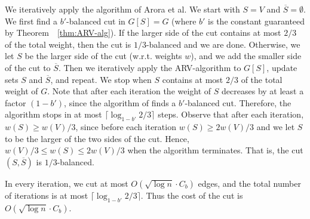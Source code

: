 \documentclass[twoside,leqno,twocolumn]{article}
\newcommand{\nots}{\overline S}
\begin{document}
We iteratively apply the algorithm of Arora et al. We start with $S = V$ and $\nots=\emptyset$. We first find a $b'$-balanced cut in $G[S] = G$ 
(where $b'$ is the constant guaranteed by Theorem~~\ref{thm:ARV-alg}). If the larger side of the cut contains at most $2/3$ of the total weight,
then the cut is $1/3$-balanced and we are done. Otherwise, we let $S$ be the larger side of the cut (w.r.t. weights $w$),
and we add the smaller side of the cut to $\nots$. Then we iteratively apply the ARV-algorithm to $G[S]$, update sets $S$ and $\nots$, and repeat.
We stop when $S$ contains at most $2/3$ of the total weight of $G$. Note that after each iteration the weight of $S$ decreases 
by at least a factor $(1-b')$, since the algorithm of \cite{ARV} finds a $b'$-balanced cut. Therefore, the algorithm stops in at most 
$\lceil \log_{1-b'} 2/3\rceil$ steps. Observe that after each iteration, $w(S) \geq w(V)/3$, since before each iteration
$w(S) \geq 2 w(V)/3$ and we let $S$ to be the larger of the two sides of the cut. Hence, $w(V)/3 \leq w(S) \leq 2w(V)/3$
when the algorithm terminates. That is, the cut $(S, \nots)$ is $1/3$-balanced. 

In every iteration, we cut at most $O(\sqrt{\log n} \cdot C_b)$ edges, and the total number of iterations is at most $\lceil\log_{1-b'} 2/3\rceil$.
Thus the cost of the cut is $O(\sqrt{\log n} \cdot C_b)$.

\fi
\end{document}
